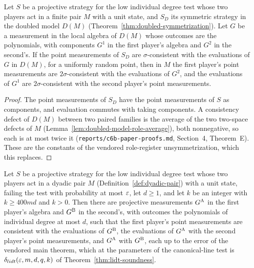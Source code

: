 \begin{lemma}
\label{lem:doubled-unsymmetrization}
\leanok
Let $S$ be a projective strategy for the low individual degree test whose two players act in a
finite pair $M$ with a unit state, and $S_D$ its symmetric strategy in the doubled model $D(M)$
(Theorem~\ref{thm:doubled-symmetrization}). Let $G$ be a measurement in the local algebra of
$D(M)$ whose outcomes are the polynomials, with components $G^1$ in the first player's algebra and
$G^2$ in the second's. If the point measurements of $S_D$ are $\sigma$-consistent with the
evaluations of $G$ in $D(M)$, for a uniformly random point, then in $M$ the first player's point
measurements are $2\sigma$-consistent with the evaluations of $G^2$, and the evaluations of $G^1$
are $2\sigma$-consistent with the second player's point measurements.
\end{lemma}

\begin{proof}
\leanok
The point measurements of $S_D$ have the point measurements of $S$ as components, and evaluation
commutes with taking components. A consistency defect of $D(M)$ between two paired families is the
average of the two two-space defects of $M$ (Lemma~\ref{lem:doubled-model-role-average}), both
nonnegative, so each is at most twice it (\texttt{reports/c6b-paper-proofs.md}, Section~4,
Theorem~E). These are the constants of the vendored role-register unsymmetrization, which this
replaces.
\end{proof}

\begin{theorem}
\label{thm:co-main-formal}
\leanok
Let $S$ be a projective strategy for the low individual degree test whose two players act in a
dyadic pair $M$ (Definition~\ref{def:dyadic-pair}) with a unit state, failing the test with
probability at most $\varepsilon$, let $d \geq 1$, and let $k$ be an integer with $k \geq 400 m d$ and
$k > 0$. Then there are projective measurements $G^{\textsc{A}}$ in the first player's algebra and
$G^{\textsc{B}}$ in the second's, with outcomes the polynomials of individual degree at most $d$, such
that the first player's point measurements are consistent with the evaluations of $G^{\textsc{B}}$, the
evaluations of $G^{\textsc{A}}$ with the second player's point measurements, and $G^{\textsc{A}}$ with
$G^{\textsc{B}}$, each up to the error of the vendored main theorem, which at the parameters of the
canonical-line test is $\delta_{lidt}(\varepsilon, m, d, q, k)$ of Theorem~\ref{thm:lidt-soundness}.
\end{theorem}

